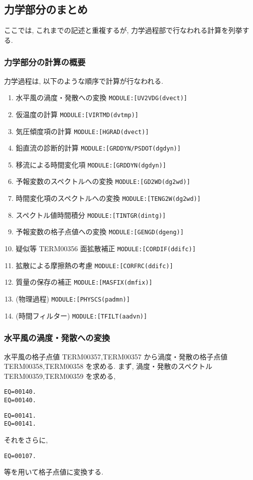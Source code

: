 ﻿
\subsection{力学部分のまとめ}

ここでは, これまでの記述と重複するが,
力学過程部で行なわれる計算を列挙する.

\subsubsection{力学部分の計算の概要}

力学過程は, 以下のような順序で計算が行なわれる.

\begin{enumerate}
\item 水平風の渦度・発散への変換   \texttt{MODULE:[UV2VDG(dvect)]}
\item 仮温度の計算              \texttt{MODULE:[VIRTMD(dvtmp)]}
\item 気圧傾度項の計算           \texttt{MODULE:[HGRAD(dvect)]}
\item 鉛直流の診断的計算         \texttt{MODULE:[GRDDYN/PSDOT(dgdyn)]}
\item 移流による時間変化項 \texttt{MODULE:[GRDDYN(dgdyn)]}
\item 予報変数のスペクトルへの変換 \texttt{MODULE:[GD2WD(dg2wd)]}
\item 時間変化項のスペクトルへの変換 \texttt{MODULE:[TENG2W(dg2wd)]}
\item スペクトル値時間積分 \texttt{MODULE:[TINTGR(dintg)]}
\item 予報変数の格子点値への変換 \texttt{MODULE:[GENGD(dgeng)]}
\item 疑似等 TERM00356 面拡散補正   \texttt{MODULE:[CORDIF(ddifc)]}
\item 拡散による摩擦熱の考慮    \texttt{MODULE:[CORFRC(ddifc)]}
\item 質量の保存の補正          \texttt{MODULE:[MASFIX(dmfix)]}
\item (物理過程)             \texttt{MODULE:[PHYSCS(padmn)]}
\item (時間フィルター)        \texttt{MODULE:[TFILT(aadvn)]}
\end{enumerate}

\subsubsection{水平風の渦度・発散への変換}

水平風の格子点値 TERM00357,TERM00357 
から渦度・発散の格子点値 TERM00358,TERM00358 を求める.
まず, 渦度・発散のスペクトル
TERM00359,TERM00359 を求める,
\begin{verbatim}
EQ=00140.
EQ=00140.
\end{verbatim}
\begin{verbatim}
EQ=00141.
EQ=00141.
\end{verbatim}
それをさらに, 
\begin{verbatim}
EQ=00107.
\end{verbatim}
等を用いて格子点値に変換する.

